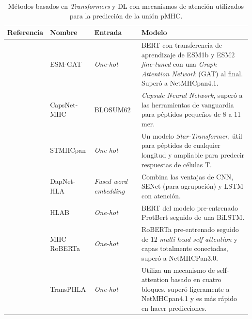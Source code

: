 \begin{table}[ht]
	\caption{Métodos basados en \textit{Transformers} y DL con mecanismos de atención utilizados para la predicción de la unión pMHC.}
	\label{tab:transformes}
	\setlength{\tabcolsep}{0.5em} %
	{\renewcommand{\arraystretch}{1.1}%
		
		\begin{scriptsize}
			
		
		\begin{tabular}{p{2.5cm}p{2.5cm}p{2cm}p{6.2cm}}
			\multicolumn{1}{l}{\textbf{Referencia}}                                   & \textbf{Nombre}             & \textbf{Entrada}            & \textbf{Modelo}     \\  \midrule
			
			\cite{hashemi2023improved}&	ESM-GAT  &	\textit{One-hot} & BERT con transferencia de aprendizaje de ESM1b y ESM2 \textit{fine-tuned} con una \textit{Graph Attention Network} (GAT) al final. Superó a NetMHCpan4.1.	\\
			
			
			\cite{kalemati2023capsnet}&	CapsNet-MHC&	BLOSUM62 & \textit{Capsule Neural Network}, superó a las herramientas de vanguardia para péptidos pequeños de 8 a 11 mer.	\\
			
			\cite{ye2023stmhcpan}&	STMHCpan  &	\textit{One-hot} & Un modelo \textit{Star-Transformer}, útil para péptidos de cualquier longitud y ampliable para predecir respuestas de células T.	\\
			
			\cite{jing2023dapnet}&	DapNet-HLA&	\textit{Fused word embedding} & Combina las ventajas de CNN, SENet (para agrupación) y LSTM con atención.	\\
			
			\cite{zhang2022hlab}&	HLAB&	\textit{One-hot} & BERT del modelo pre-entrenado ProtBert seguido de una BiLSTM.	\\
			
			\cite{wang2022mhcroberta}          & MHC RoBERTa            & \textit{One-hot} & RoBERTa pre-entrenado seguido de 12 \textit{multi-head self-attention} y capas totalmente conectadas, superó a NetMHCPan3.0.                                                                                          \\
			\cite{chu2022transformer}          & TransPHLA             & \textit{One-hot}         & Utiliza un mecanismo de self-attention basado en cuatro bloques, superó ligeramente a NetMHCpan4.1 y es más rápido en hacer predicciones.\\
			

\end{tabular}
\end{scriptsize}}
\end{table}
